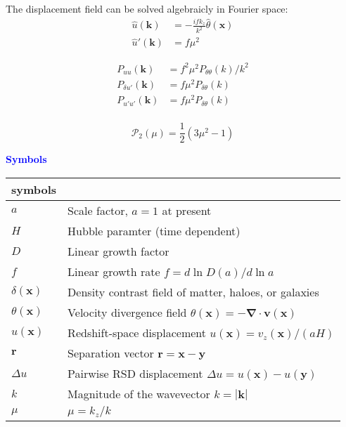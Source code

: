 \documentclass[a4paper,11pt, fleqn]{article}
\begin{document}
The displacement field can be solved algebraicly in Fourier space:
\begin{align}
  \hat{u}(\bm{k}) &= -\frac{ifk_z}{k^2} \hat{\theta}(\bm{x})\\
  \hat{u}'(\bm{k}) &= f\mu^2
\end{align}


\begin{align}
  P_{uu}(\bm{k}) &= f^2\mu^2 P_{\theta\theta}(k)/k^2\\
  P_{\delta u'}(\bm{k}) &= f \mu^2 P_{\delta \theta}(k)\\
  P_{u' u'}(\bm{k}) &= f \mu^2 P_{\delta \theta}(k)\\
\end{align}


\newpage

\begin{equation}
  \mathcal{P}_2(\mu) = \frac{1}{2}\left( 3 \mu^2 - 1 \right)
\end{equation}

%
%
\newpage
{\Huge \textbf{\textcolor{Blue}{Symbols}}}

\begin{center}
  \begin{tabular}{ll}
    symbols & \\
    \hline
    $a$ & Scale factor, $a=1$ at present\\
    $H$ & Hubble paramter (time dependent)\\
    $D$ & Linear growth factor\\
    $f$ & Linear growth rate $f = d \ln D(a)/d\ln a$\\
    $\delta(\bm{x})$ & Density contrast field of matter, haloes, or galaxies\\
    
    $\theta(\bm{x})$ & Velocity divergence field
    $\theta(\bm{x}) = -\bm{\nabla} \cdot \bm{v}(\bm{x})$\\
    $u(\bm{x})$ & Redshift-space displacement $u(\bm{x}) = v_z(\bm{x})/(aH)$\\
    $\bm{r}$ & Separation vector $\bm{r} = \bm{x} - \bm{y}$\\
    $\Delta u$ & Pairwise RSD displacement $\Delta u = u(\bm{x}) - u(\bm{y})$\\
    $k$ & Magnitude of the wavevector $k = |\bm{k}|$\\
    $\mu$ & $\mu=k_z/k$\\
    \hline
  \end{tabular}
\end{center}
\end{document}

